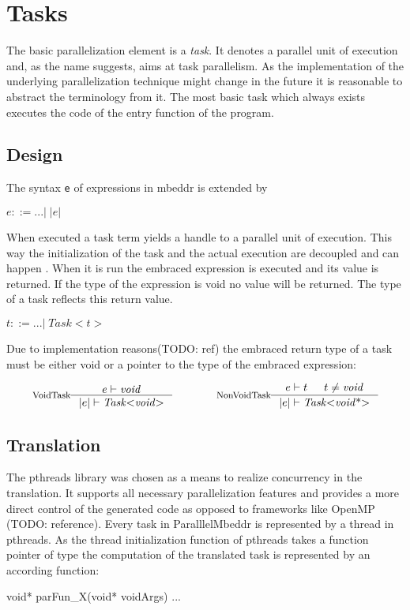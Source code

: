 \section{Tasks}
The basic parallelization element is a \textit{task}. It denotes a parallel unit of execution and, as the name suggests, aims at task parallelism. As the implementation of the underlying parallelization technique might change in the future it is reasonable to abstract the terminology from it. The most basic task which always exists executes the code of the entry function of the program.
\subsection{Design}
The syntax \texttt{e} of expressions in mbeddr is extended by

$e ::= ...|\;\mathit{|e|}$

When executed a task term yields a handle to a parallel unit of execution. This way the initialization of the task and the actual execution are decoupled and can happen . When it is run the embraced expression is executed and its value is returned. If the type of the expression is void no value will be returned. The type of a task reflects this return value.

$t ::= ... |\;\mathit{Task{<}t{>}}$

Due to implementation reasons(TODO: ref) the embraced return type of a task must be either void or a pointer to the type of the embraced expression:

\begin{align*}
\inference*[VoidTask]{e |- \mathit{void}}{|e| |- \mathit{Task{<}void{>}}} 
\qquad\qquad
\inference*[NonVoidTask]{e |- t & t \neq \mathit{void}}{|e| |- \mathit{Task{<}void{\text{*}}{>}}}
\end{align*}


\subsection{Translation}
The pthreads library was chosen as a means to realize concurrency in the translation. It supports all necessary parallelization features and provides a more direct control of the generated code as opposed to frameworks like OpenMP (TODO: reference). Every task in ParalllelMbeddr is represented by a thread in pthreads. As the thread initialization function of pthreads takes a function pointer of type  the computation of the translated task is represented by an according function:
\begin{ccode}
void* parFun_X(void* voidArgs) {...}
\end{ccode}

